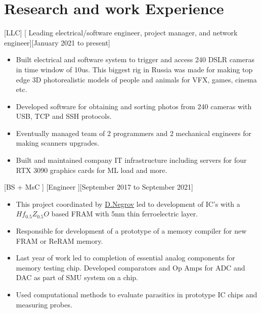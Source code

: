 \documentclass{article}
\begin{document}
\section{Research and work Experience}
 

 


[LLC]
[ Leading electrical/software engineer, project manager, and network engineer][January 2021 to present]
 
\begin{itemize}
   \item Built electrical and software system to trigger and access 240 DSLR cameras in time window of 10us. This biggest rig in Russia was made for making top edge 3D photorealistic models of people and animals for VFX, games, cinema etc.
   \item Developed software for obtaining and sorting photos from 240 cameras with USB, TCP and SSH protocols.
   \item Eventually managed team of 2 programmers and 2 mechanical engineers for making scanners upgrades.
   \item Built and maintained company IT infrastructure including servers for four RTX 3090 graphics cards for ML load and more.
   \end{itemize}

[BS + MsC ]
[Engineer ][September 2017 to September 2021]

\begin{itemize}
\item This project coordinated by  \href{https://www.scopus.com/authid/detail.uri?authorId=56272708000}{D.Negrov}   led to development of IC's with a $Hf_{0.5} Z_{0.5} O $ based  FRAM with 5nm thin ferroelectric layer.
\item Responsible for development of a prototype of a memory  compiler for new FRAM or ReRAM memory.
\item Last year of work led to completion of essential analog components for memory testing chip. Developed comparators and Op Amps for ADC and DAC as part of SMU system on a chip.
\item Used computational methods to evaluate parasitics in prototype IC chips and measuring probes.

\end{itemize}
 
\end{document}
